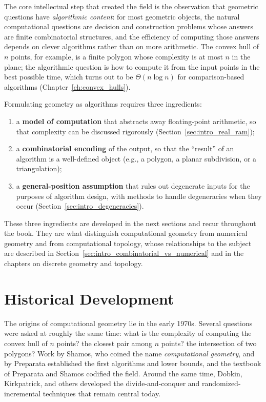 The core intellectual step that created the field is the observation that
geometric questions have \emph{algorithmic content}: for most geometric
objects, the natural computational questions are decision and construction
problems whose answers are finite combinatorial structures, and the
efficiency of computing those answers depends on clever algorithms rather
than on more arithmetic. The convex hull of $n$ points, for example, is a
finite polygon whose complexity is at most $n$ in the plane; the algorithmic
question is how to compute it from the input points in the best possible
time, which turns out to be $\Theta(n \log n)$ for comparison-based
algorithms (Chapter~\ref{ch:convex_hulls}).

Formulating geometry as algorithms requires three ingredients:
\begin{enumerate}
  \item a \textbf{model of computation} that abstracts away floating-point
    arithmetic, so that complexity can be discussed rigorously
    (Section~\ref{sec:intro_real_ram});
  \item a \textbf{combinatorial encoding} of the output, so that the
    ``result'' of an algorithm is a well-defined object (e.g., a polygon, a
    planar subdivision, or a triangulation);
  \item a \textbf{general-position assumption} that rules out degenerate
    inputs for the purposes of algorithm design, with methods to handle
    degeneracies when they occur (Section~\ref{sec:intro_degeneracies}).
\end{enumerate}

These three ingredients are developed in the next sections and recur
throughout the book. They are what distinguish computational geometry from
numerical geometry and from computational topology, whose relationships to
the subject are described in Section~\ref{sec:intro_combinatorial_vs_numerical}
and in the chapters on discrete geometry and topology.

\section{Historical Development}
\label{sec:intro_history}

The origins of computational geometry lie in the early 1970s. Several
questions were asked at roughly the same time: what is the complexity of
computing the convex hull of $n$ points? the closest pair among $n$ points?
the intersection of two polygons? Work by Shamos, who coined the name
\emph{computational geometry}, and by Preparata established the first
algorithms and lower bounds, and the textbook of Preparata and Shamos
\cite{preparata1985} codified the field. Around the same time, Dobkin,
Kirkpatrick, and others developed the divide-and-conquer and
randomized-incremental techniques that remain central today.


